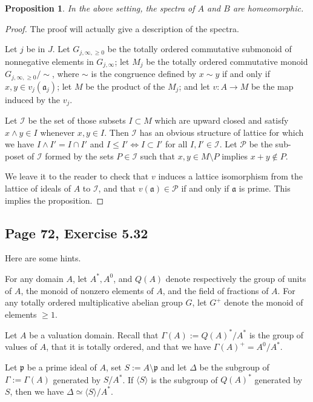 \documentclass[parskip=half,fontsize=12pt]{scrartcl}%
\newcommand{\mf}{\mathfrak}
\newcommand{\aaa}{\mf a}
\newcommand{\ppp}{\mf p}
\newtheorem{prop}[thm]{Proposition}
\begin{document}
\begin{prop}
In the above setting, the spectra of $A$ and $B$ are homeomorphic.
\end{prop}

\begin{proof}
The proof will actually give a description of the spectra. 

Let $j$ be in $J$. Let $G_{j,\infty,\ge0}$ be the totally ordered commutative submonoid of nonnegative elements in $G_{j,\infty}$; let $M_j$ be the totally ordered commutative monoid $G_{j,\infty,\ge0}/\!\sim$, where $\sim$ is the congruence defined by $x\sim y$ if and only if $x,y\in v_j(\aaa_j)$; let $M$ be the product of the $M_j$; and let $v:A\to M$ be the map induced by the $v_j$. 

Let $\mathcal I$ be the set of those subsets $I\subset M$ which are upward closed and satisfy $x\land y\in I$ whenever $x,y\in I$. Then $\mathcal I$ has an obvious structure of lattice for which we have $I\land I'=I\cap I'$ and $I\le I'\iff I\subset I'$ for all $I,I'\in\mathcal I$. Let $\mathcal P$ be the sub-poset of $\mathcal I$ formed by the sets $P\in\mathcal I$ such that $x,y\in M\setminus P$ implies $x+y\notin P$.

We leave it to the reader to check that $v$ induces a lattice isomorphism from the lattice of ideals of $A$ to $\mathcal I$, and that $v(\aaa)\in\mathcal P$ if and only if $\aaa$ is prime. This implies the proposition. 
\end{proof}

\subsection{Page 72, Exercise 5.32}%

Here are some hints.

For any domain $A$, let $A^*,A^0$, and $Q(A)$ denote respectively the group of units of $A$, the monoid of nonzero elements of $A$, and the field of fractions of $A$. For any totally ordered multiplicative abelian group $G$, let $G^+$ denote the monoid of elements $\ge1$. 

Let $A$ be a valuation domain. Recall that $\Gamma(A):=Q(A)^*/A^*$ is the group of values of $A$, that it is totally ordered, and that we have $\Gamma(A)^+=A^0/A^*$. 

Let $\ppp$ be a prime ideal of $A$, set $S:=A\setminus\ppp$ and let $\Delta$ be the subgroup of $\Gamma:=\Gamma(A)$ generated by $S/A^*$. If $\langle S\rangle$ is the subgroup of $Q(A)^*$ generated by $S$, then we have $\Delta\simeq\langle S\rangle/A^*$.
\end{document}
